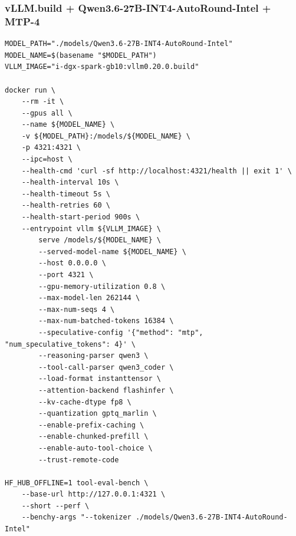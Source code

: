 \documentclass{article}
\begin{document}
\subsubsection{vLLM.build + Qwen3.6-27B-INT4-AutoRound-Intel + MTP-4}
\begin{lstlisting}
MODEL_PATH="./models/Qwen3.6-27B-INT4-AutoRound-Intel"
MODEL_NAME=$(basename "$MODEL_PATH")
VLLM_IMAGE="i-dgx-spark-gb10:vllm0.20.0.build"

docker run \
    --rm -it \
    --gpus all \
    --name ${MODEL_NAME} \
    -v ${MODEL_PATH}:/models/${MODEL_NAME} \
    -p 4321:4321 \
    --ipc=host \
    --health-cmd 'curl -sf http://localhost:4321/health || exit 1' \
    --health-interval 10s \
    --health-timeout 5s \
    --health-retries 60 \
    --health-start-period 900s \
    --entrypoint vllm ${VLLM_IMAGE} \
        serve /models/${MODEL_NAME} \
        --served-model-name ${MODEL_NAME} \
        --host 0.0.0.0 \
        --port 4321 \
        --gpu-memory-utilization 0.8 \
        --max-model-len 262144 \
        --max-num-seqs 4 \
        --max-num-batched-tokens 16384 \
        --speculative-config '{"method": "mtp", "num_speculative_tokens": 4}' \
        --reasoning-parser qwen3 \
        --tool-call-parser qwen3_coder \
        --load-format instanttensor \
        --attention-backend flashinfer \
        --kv-cache-dtype fp8 \
        --quantization gptq_marlin \
        --enable-prefix-caching \
        --enable-chunked-prefill \
        --enable-auto-tool-choice \
        --trust-remote-code

HF_HUB_OFFLINE=1 tool-eval-bench \
    --base-url http://127.0.0.1:4321 \
    --short --perf \
    --benchy-args "--tokenizer ./models/Qwen3.6-27B-INT4-AutoRound-Intel"
\end{lstlisting}
\end{document}
